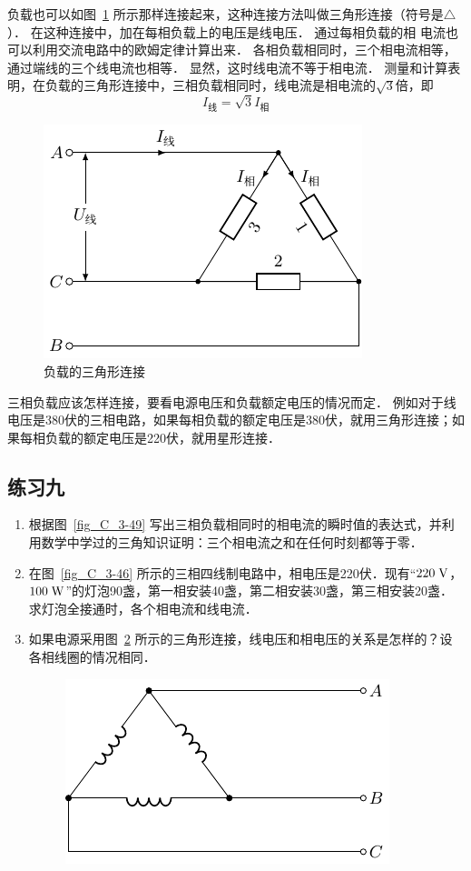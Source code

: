 负载也可以如图~\ref{fig_C_3-52} 所示那样连接起来，这种连接方法叫做三角形连接（符号是$\triangle$）．
在这种连接中，加在每相负载上的电压是线电压．
通过每相负载的相
电流也可以利用交流电路中的欧姆定律计算出来．
各相负载相同时，三个相电流相等，通过端线的三个线电流也相等．
显然，这时线电流不等于相电流．
测量和计算表明，在负载的三角形连接中，三相负载相同时，线电流是相电流的$\sqrt{3}$倍，即
\[I_{\text{线}}=\sqrt{3}I_{\text{相}}\]
\begin{figure}[htbp]
    \centering
    \includegraphics{fig/C/3-52.pdf}
    \caption{负载的三角形连接}\label{fig_C_3-52}
\end{figure}

三相负载应该怎样连接，要看电源电压和负载额定电压的情况而定．
例如对于线电压是380伏的三相电路，如果每相负载的额定电压是380伏，就用三角形连接；如果每相负载的额定电压是220伏，就用星形连接．

\subsection*{练习九}
\begin{enumerate}
    \item 根据图~\ref{fig_C_3-49} 写出三相负载相同时的相电流的瞬时值的表达式，并利用数学中学过的三角知识证明：三个相电流之和在任何时刻都等于零．
    \item 在图~\ref{fig_C_3-46} 所示的三相四线制电路中，相电压是220伏．现有“$220\;\text{V} $，$ 100\;\text{W}$”的灯泡90盏，第一相安装40盏，第二相安装30盏，第三相安装20盏．求灯泡全接通时，各个相电流和线电流．
    \item 如果电源采用图~\ref{fig_C_3-53} 所示的三角形连接，线电压和相电压的关系是怎样的？设各相线圈的情况相同．
    \begin{figure}[htbp]
    	\centering
    	\includegraphics{fig/C/3-53.pdf}
    	\caption{}\label{fig_C_3-53}
    \end{figure}
\end{enumerate}



